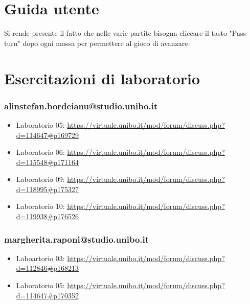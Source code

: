 \documentclass[a4paper,12pt]{report}
\begin{document}
\appendix

\chapter{Guida utente}

Si rende presente il fatto che nelle varie partite bisogna cliccare il tasto "Pass turn" dopo ogni mossa per permettere al gioco di avanzare.

\chapter{Esercitazioni di laboratorio}

\subsection{alinstefan.bordeianu@studio.unibo.it}

\begin{itemize}
	\item Laboratorio 05: \url{https://virtuale.unibo.it/mod/forum/discuss.php?d=114647#p169729}
	
	\item Laboratorio 06: \url{https://virtuale.unibo.it/mod/forum/discuss.php?d=115548#p171164}
	
	\item Laboratorio 09: \url{https://virtuale.unibo.it/mod/forum/discuss.php?d=118995#p175327}
	
	\item Laboratorio 10: \url{https://virtuale.unibo.it/mod/forum/discuss.php?d=119938#p176526}
\end{itemize}

\subsection{margherita.raponi@studio.unibo.it}
\begin{itemize}
	\item Laboartorio 03: \url{https://virtuale.unibo.it/mod/forum/discuss.php?d=112846#p168213}
	\item Laboratorio 05: \url{https://virtuale.unibo.it/mod/forum/discuss.php?d=114647#p170352}
\end{itemize}
\end{document}
